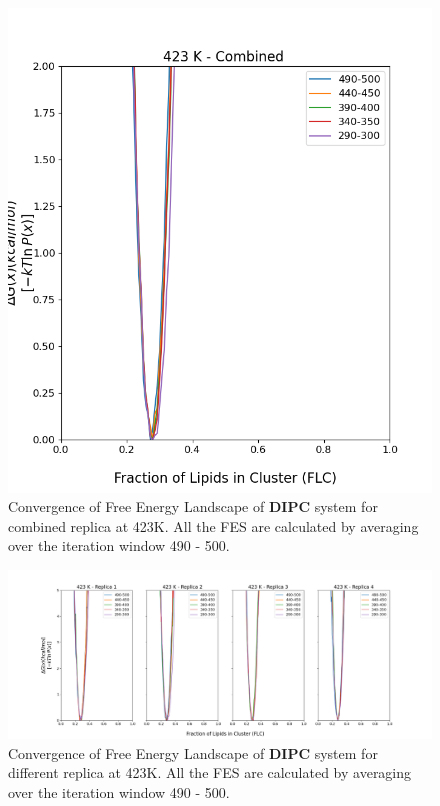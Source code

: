 \documentclass{biophys-new}
\begin{document}
\begin{figure}[hbt!]
\centering
\includegraphics[width=0.6\linewidth]{all_plots/ClusterLipids2Total/DPPC_DIPC_CHOL/423K/Convergence_DIPC_MULTI__423_ClusterLipids2Total.png}
\caption{Convergence of Free Energy Landscape of \textbf{DIPC} system for combined replica at 423K. All the FES are calculated by averaging over the iteration window 490 - 500.}
\label{fig:view}

\end{figure}

\begin{figure}[hbt!]
\centering
\includegraphics[width=1.1\linewidth]{all_plots/ClusterLipids2Total/DPPC_DIPC_CHOL/423K/Convergence_DIPC_423_ClusterLipids2Total.png}
\caption{Convergence of Free Energy Landscape of \textbf{DIPC} system for different replica at 423K. All the FES are calculated by averaging over the iteration window 490 - 500.}
\label{fig:view}

\end{figure}
\end{document}
